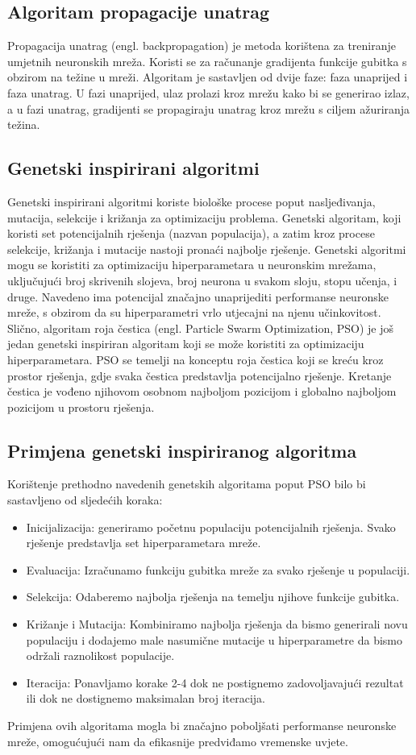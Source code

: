 \documentclass[times, utf8, zavrsni]{fer}
\begin{document}
\subsection{Algoritam propagacije unatrag}
Propagacija unatrag (engl. backpropagation) je metoda korištena za treniranje umjetnih neuronskih mreža. Koristi se za računanje gradijenta funkcije gubitka s obzirom na težine u mreži. Algoritam je sastavljen od dvije faze: faza unaprijed i faza unatrag. U fazi unaprijed, ulaz prolazi kroz mrežu kako bi se generirao izlaz, a u fazi unatrag, gradijenti se propagiraju unatrag kroz mrežu s ciljem ažuriranja težina.

\subsection{Genetski inspirirani algoritmi}
Genetski inspirirani algoritmi koriste biološke procese poput nasljeđivanja, mutacija, selekcije i križanja za optimizaciju problema. Genetski algoritam, koji koristi set potencijalnih rješenja (nazvan populacija), a zatim kroz procese selekcije, križanja i mutacije nastoji pronaći najbolje rješenje. Genetski algoritmi mogu se koristiti za optimizaciju hiperparametara u neuronskim mrežama, uključujući broj skrivenih slojeva, broj neurona u svakom sloju, stopu učenja, i druge. Navedeno ima potencijal značajno unaprijediti performanse neuronske mreže, s obzirom da su hiperparametri vrlo utjecajni na njenu učinkovitost. Slično, algoritam roja čestica (engl. Particle Swarm Optimization, PSO) je još jedan genetski inspiriran algoritam koji se može koristiti za optimizaciju hiperparametara. PSO se temelji na konceptu roja čestica koji se kreću kroz prostor rješenja, gdje svaka čestica predstavlja potencijalno rješenje. Kretanje čestica je vođeno njihovom osobnom najboljom pozicijom i globalno najboljom pozicijom u prostoru rješenja.

\subsection{Primjena genetski inspiriranog algoritma}
Korištenje prethodno navedenih genetskih algoritama poput PSO bilo bi sastavljeno od sljedećih koraka:
\begin{itemize}
    \item Inicijalizacija: generiramo početnu populaciju potencijalnih rješenja. Svako rješenje predstavlja set hiperparametara mreže.
    \item Evaluacija: Izračunamo funkciju gubitka mreže za svako rješenje u populaciji.
    \item Selekcija: Odaberemo najbolja rješenja na temelju njihove funkcije gubitka.
    \item Križanje i Mutacija: Kombiniramo najbolja rješenja da bismo generirali novu populaciju i dodajemo male nasumične mutacije u hiperparametre da bismo održali raznolikost populacije.
    \item Iteracija: Ponavljamo korake 2-4 dok ne postignemo zadovoljavajući rezultat ili dok ne dostignemo maksimalan broj iteracija.
\end{itemize}
Primjena ovih algoritama mogla bi značajno poboljšati performanse neuronske mreže, omogućujući nam da efikasnije predviđamo vremenske uvjete.
\end{document}
